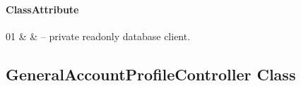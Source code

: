 \paragraph{ClassAttribute}
\begin{ClassAttributeTable}
01 &  &  -- private readonly database client. \\ \hline
\end{ClassAttributeTable}

\subsection{\texorpdfstring{General\allowbreak Account\allowbreak Profile\allowbreak Controller}{GeneralAccountProfileController} Class}
\label{cls:nhuy-GeneralAccountProfileController}

